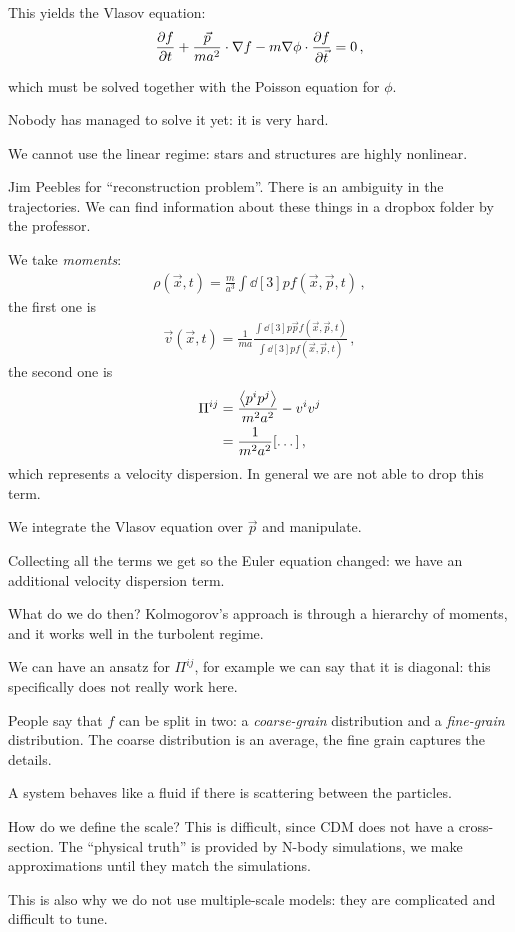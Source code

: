 \documentclass[main.tex]{subfiles}
\begin{document}
This yields the Vlasov equation: 
%
\begin{align}
\pdv{f}{t} + \frac{\vec{p}}{m a^2} \cdot \nabla f - m \nabla \phi \cdot \pdv{f}{\vec{t}}= 0
\,,
\end{align}

which must be solved together with the Poisson equation for \(\phi \).

Nobody has managed to solve it yet: it is very hard. 

We cannot use the linear regime: stars and structures are highly nonlinear. 

Jim Peebles for ``reconstruction problem''.
There is an ambiguity in the trajectories. 
We can find information about these things in a dropbox folder by the professor. 

We take \emph{moments}: 
%
\begin{align}
\rho (\vec{x}, t) = \frac{m}{a^3} \int \dd[3]{p} 
f(\vec{x}, \vec{p}, t)
\,,
\end{align}
%
the first one is
%
\begin{align}
\vec{v}(\vec{x}, t) = \frac{1}{ma} \frac{\int \dd[3]{p} \vec{p} f (\vec{x}, \vec{p}, t)}{\int \dd[3]{p} f(\vec{x}, \vec{p}, t)}
\,,
\end{align}
%
the second one is 
%
\begin{align}
\Pi^{ij} &= \frac{\expval{p^{i} p^{j}}}{m^2a^2} - v^{i} v^{j}  \\
&= \frac{1}{m^2a^2} \qty[\dots]
\,,
\end{align}
%
which represents a velocity dispersion. In general we are not able to drop this term. 

We integrate the Vlasov equation over \(\vec{p}\) and manipulate. 

Collecting all the terms we get 
%
%
so the Euler equation changed: we have an additional velocity dispersion term.

What do we do then? Kolmogorov's approach is through a hierarchy of moments, and it works well in the turbolent regime. 

We can have an ansatz for \(\Pi^{ij}\), for example we can say that it is diagonal: this specifically does not really work here. 

People say that \(f\) can be split in two: a \emph{coarse-grain} distribution and a \emph{fine-grain} distribution. The coarse distribution is an average, the fine grain captures the details. 

A system behaves like a fluid if there is scattering between the particles. 

How do we define the scale? This is difficult, since CDM does not have a cross-section.
The ``physical truth'' is provided by N-body simulations, we make approximations until they match the simulations.

This is also why we do not use multiple-scale models: they are complicated and difficult to tune.
\end{document}
